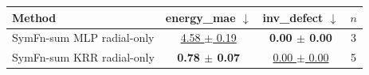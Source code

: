 \begin{tabular}{lccc}
\toprule
Method & energy\_mae $\downarrow$ & inv\_defect $\downarrow$ & $n$ \\
\midrule
SymFn-sum MLP radial-only & \underline{4.58 $\pm$ 0.19} & \textbf{0.00 $\pm$ 0.00} & 3 \\
SymFn-sum KRR radial-only & \textbf{0.78 $\pm$ 0.07} & \underline{0.00 $\pm$ 0.00} & 5 \\
\bottomrule
\end{tabular}
